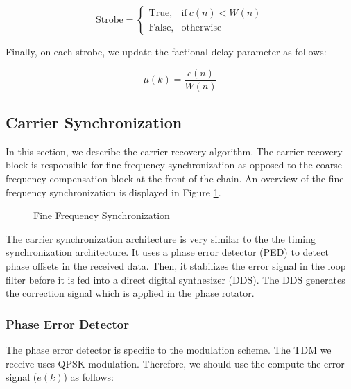 \documentclass[conference,onecolumn]{IEEEtran}
\begin{document}
\begin{equation}
	\text{Strobe} = \begin{cases}
		\text{True}, & \text{if}\ c(n) < W(n)\\
		\text{False}, & \text{otherwise}
	\end{cases}
\end{equation}

\noindent Finally, on each strobe, we update the factional delay parameter as follows:

\begin{equation}
	\mu(k) = \frac{c(n)}{W(n)}
\end{equation}

\subsection{Carrier Synchronization}

In this section, we describe the carrier recovery algorithm. The carrier recovery block is responsible for fine frequency synchronization as opposed to the coarse frequency compensation block at the front of the chain. An overview of the fine frequency synchronization is displayed in Figure \ref{fig::carrier_synchronization}.

\begin{figure}[H]
	\centerline{}
	\caption{Fine Frequency Synchronization}
	\label{fig::carrier_synchronization}
\end{figure}

The carrier synchronization architecture is very similar to the the timing synchronization architecture. It uses a phase error detector (PED) to detect phase offsets in the received data. Then, it stabilizes the error signal in the loop filter before it is fed into a direct digital synthesizer (DDS). The DDS generates the correction signal which is applied in the phase rotator.

\subsubsection{Phase Error Detector}

The phase error detector is specific to the modulation scheme. The TDM we receive uses QPSK modulation. Therefore, we should use the compute the error signal ($e(k)$) as follows:
\end{document}
